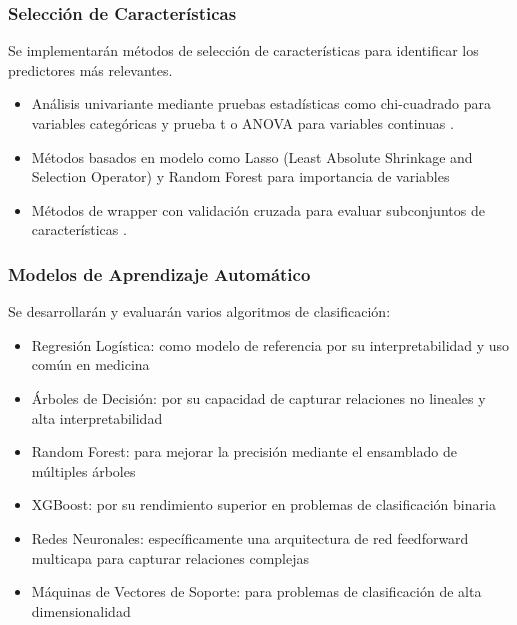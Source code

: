 \documentclass{article}
\begin{document}
\subsubsection{Selección de Características}
Se implementarán métodos de selección de características
para identificar los predictores más relevantes.

\begin{itemize}
\item Análisis univariante mediante pruebas estadísticas como
chi-cuadrado para variables categóricas y prueba t o ANOVA
para variables continuas \cite{guyon2003introduction}.
\item Métodos basados en modelo como Lasso (Least Absolute
Shrinkage and Selection Operator) y Random Forest para
importancia de variables \cite{tibshirani1996regression}
\item Métodos de wrapper con validación cruzada para evaluar
subconjuntos de características \cite{kohavi1997wrappers}.
\end{itemize}

\subsubsection{Modelos de Aprendizaje Automático}
Se desarrollarán y evaluarán varios algoritmos de clasificación:

\begin{itemize}
    \item Regresión Logística: como modelo de referencia por
        su interpretabilidad y uso común en medicina
        \cite{Hosmer2013}
    \item Árboles de Decisión: por su capacidad de capturar
        relaciones no lineales y alta
        interpretabilidad\cite{quinlan1986induction}
    \item Random Forest: para mejorar la precisión mediante
        el ensamblado de múltiples árboles
        \cite{breiman2001random}
    \item XGBoost: por su rendimiento superior en problemas
        de clasificación binaria \cite{Chen2016}
    \item Redes Neuronales: específicamente una arquitectura
        de red feedforward multicapa para capturar
        relaciones complejas \cite{Goodfellow2016}
    \item Máquinas de Vectores de Soporte: para problemas de
        clasificación de alta dimensionalidad
        \cite{Cortes1995}
\end{itemize}
\end{document}
